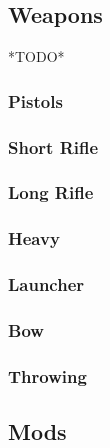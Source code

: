 \documentclass[12pt,a4paper,openany]{book}
\begin{document}
	\subsection{Weapons}
	*TODO*
	\subsubsection{Pistols}
	\subsubsection{Short Rifle}
	\subsubsection{Long Rifle}
	\subsubsection{Heavy}
	\subsubsection{Launcher}
	\subsubsection{Bow}
	\subsubsection{Throwing}
	\subsection{Mods}
\end{document}
